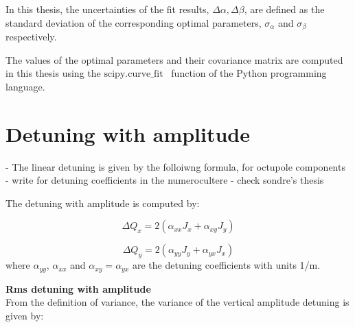 In this thesis, the uncertainties of the fit results, $\Delta \alpha, \Delta \beta$, are defined as the standard deviation of the corresponding optimal parameters, $\sigma_{\alpha}$ and  $\sigma_{\beta}$ respectively.

The values of the optimal parameters and their covariance matrix are computed in this thesis using the $\mathrm{scipy.curve \_ fit}$~\cite{scipy_curve_fit} function of the Python programming language.


\section{Detuning with amplitude}\label{app:detuning_with_amplitude}
- The linear detuning is given by the folloiwng formula, for octupole components
- write for detuning coefficients in the numerocultere
- check sondre's thesis

The detuning with amplitude is computed by:

\begin{equation}\label{eq:x_amplDetuning}
    \Delta Q_x = 2(\alpha_{xx}J_x + \alpha_{xy}J_y)
\end{equation}

\begin{equation}\label{eq:y_amplDetuning}
    \Delta Q_y = 2(\alpha_{yy}J_y + \alpha_{yx}J_x)
\end{equation}
where $\alpha_{yy}$, $\alpha_{xx}$ and $\alpha_{xy}=\alpha_{yx}$ are the detuning coefficients with units 1/m.


\normalsize{\textbf{Rms detuning with amplitude}}\\

From the definition of variance, the variance of the vertical amplitude detuning is given by:

